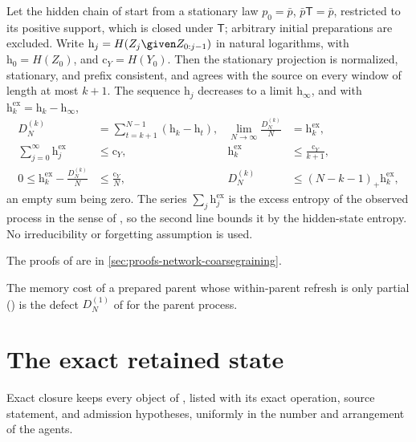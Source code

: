 Let the hidden chain of  start from a stationary law
$p_0=\bar p$, $\bar p\mathsf T=\bar p$, restricted to its positive support, which is
closed under $\mathsf T$; arbitrary initial preparations are excluded. Write
$\mathrm h_j=H(Z_j\given Z_{0:j-1})$ in natural logarithms, with
$\mathrm h_0=H(Z_0)$, and $\mathrm c_Y=H(Y_0)$. Then the stationary projection is
normalized, stationary, and prefix consistent, and agrees with the source on every
window of length at most $k+1$. The sequence $\mathrm h_j$ decreases to a limit
$\mathrm h_\infty$, and with $\mathrm h^{\mathrm{ex}}_k=\mathrm h_k-\mathrm h_\infty$,
\begin{equation}
\begin{aligned}
D^{(k)}_N&=\sum_{t=k+1}^{N-1}(\mathrm h_k-\mathrm h_t),
&\lim_{N\to\infty}\frac{D^{(k)}_N}N&=\mathrm h^{\mathrm{ex}}_k,\\
\sum_{j=0}^\infty\mathrm h^{\mathrm{ex}}_j&\le\mathrm c_Y,
&\mathrm h^{\mathrm{ex}}_k&\le\frac{\mathrm c_Y}{k+1},\\
0\le\mathrm h^{\mathrm{ex}}_k-\frac{D^{(k)}_N}N&\le\frac{\mathrm c_Y}N,
&D^{(k)}_N&\le(N-k-1)_+\mathrm h^{\mathrm{ex}}_k,
\end{aligned}
\label{eq:rg-memory-duration-identities}
\end{equation}
an empty sum being zero. The series $\sum_j\mathrm h^{\mathrm{ex}}_j$ is the excess
entropy of the observed process in the sense of \citet{CrutchfieldFeldman2003}, so the
second line bounds it by the hidden-state entropy. No irreducibility or forgetting
assumption is used. 

The proofs of  are in
\cref{sec:proofs-network-coarsegraining}.

The memory cost of a prepared parent whose within-parent refresh is only partial
() is the defect $D^{(1)}_N$ of
 for the parent process.

\section{The exact retained state}
\label{sec:rg-closure-theorem}

Exact closure keeps every object of , listed with its
exact operation, source statement, and admission hypotheses, uniformly in the
number and arrangement of the agents.

